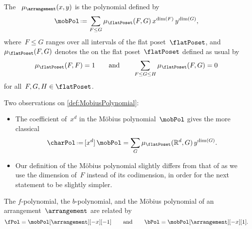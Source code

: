 \begin{definition}
\label{def:MobiusPolynomial}
The ~$\mu_{\arrangement}(x,y)$ is the polynomial defined by
\[
\mobPol \eqdef \sum_{F \le G} \mu_{\flatPoset}(F,G) \, x^{\dim(F)} \, y^{\dim(G)},
\]
where~$F \le G$ ranges over all intervals of the flat poset~$\flatPoset$, and~$\mu_{\flatPoset}(F,G)$ denotes the  on the flat poset~$\flatPoset$ defined as usual by
\[
\mu_{\flatPoset}(F, F) = 1
\qquad\text{and}\qquad
\sum_{F \le G \le H} \mu_{\flatPoset}(F,G) = 0
\]
for all~$F, G, H \in \flatPoset$.
\end{definition}

\begin{remark}
Two observations on \cref{def:MobiusPolynomial}:
\begin{itemize}
\item The coefficient of~$x^d$ in the M\"obius polynomial~$\mobPol$ gives the more classical 
\[
\charPol \eqdef [x^d] \, \mobPol = \sum_G \mu_{\flatPoset}(\R^d,G) \, y^{\dim(G)}.
\]
\item Our definition of the M\"obius polynomial slightly differs from that of \cite{Zaslavsky} as we use the dimension of~$F$ instead of its codimension, in order for the next statement to be slightly simpler.
\end{itemize}
\end{remark}

\begin{theorem}
\label{thm:Zaslavsky}
The $f$-polynomial, the $b$-polynomial, and the M\"obius polynomial of an arrangement~$\arrangement$ are related by
\[
\fPol = \mobPol[\arrangement][-x][-1]
\qquad\text{and}\qquad
\bPol = \mobPol[\arrangement][-x][1].
\]
\end{theorem}

